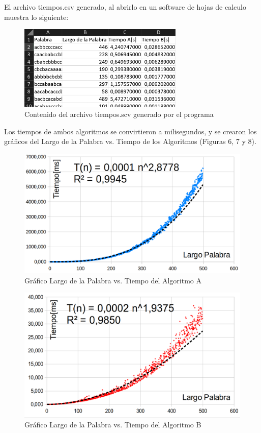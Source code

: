 \documentclass[12pt]{article}
\begin{document}
El archivo tiempos.csv generado, al abrirlo en un software de hojas de calculo muestra lo siguiente: 

\begin{figure}[ht]
    \centering
    \includegraphics[width=0.7\textwidth]{excel-csv.png}
    \caption{Contenido del archivo tiempos.scv generado por el programa}
\end{figure}

Los tiempos de ambos algoritmos se convirtieron a milisegundos, y se crearon los gráficos del Largo de la Palabra vs. Tiempo de los Algoritmos (Figuras 6, 7 y 8).

\begin{figure}[htbp]
    \centering
    \includegraphics[width=\textwidth]{Grafico1.png}
    \caption{Gráfico Largo de la Palabra vs. Tiempo del Algoritmo A}
\end{figure}

\begin{figure}[htbp]
    \centering
    \includegraphics[width=\textwidth]{Grafico2.png}
    \caption{Gráfico Largo de la Palabra vs. Tiempo del Algoritmo B}
\end{figure}
\end{document}

